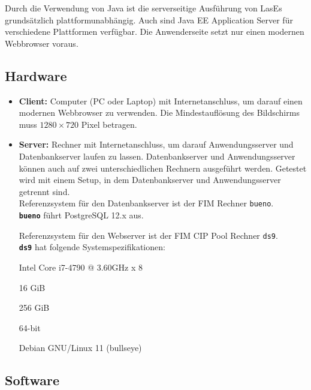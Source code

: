 
Durch die Verwendung von Java ist die serverseitige Ausführung von LasEs
grundsätzlich plattformunabhängig. Auch sind Java EE Application Server für verschiedene Plattformen verfügbar.
Die Anwenderseite setzt nur einen modernen Webbrowser voraus.

\subsection{Hardware}

\begin{itemize}
	\item \textbf{Client:} Computer (PC oder Laptop) mit Internetanschluss, um darauf einen modernen Webbrowser zu verwenden. Die Mindestauflösung des Bildschirms muss $1280 \times 720$ Pixel betragen.

	\item \textbf{Server:} Rechner mit Internetanschluss, um darauf Anwendungsserver und Datenbankserver laufen zu lassen. Datenbankserver und Anwendungsserver können auch auf zwei unterschiedlichen Rechnern ausgeführt werden. Getestet wird mit einem Setup, in dem Datenbankserver und Anwendungsserver getrennt sind.\\

	 \label{dbspezi}
	Referenzsystem für den Datenbankserver ist der FIM Rechner \texttt{bueno}.\\
	\texttt{\textbf{bueno}} führt PostgreSQL 12.x aus.

	 \label{spezi}
	Referenzsystem für den Webserver ist der FIM CIP Pool Rechner \texttt{ds9}.\\
	\texttt{\textbf{ds9}} hat folgende Systemspezifikationen:

	\begin{itemize}
		 Intel Core i7-4790 @ 3.60GHz x 8

		 16 GiB

		 256 GiB

		 64-bit

		 Debian GNU/Linux 11 (bullseye)
	\end{itemize}


\end{itemize}

\subsection{Software}

